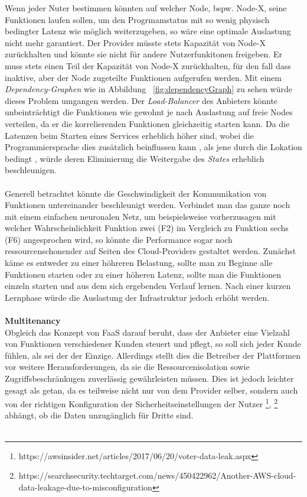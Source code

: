 \documentclass[11pt]{article}
\begin{document}
Wenn jeder Nuter bestimmen könnten auf welcher Node, bspw. Node-X, seine Funktionen laufen sollen, um den Progrmamstatus mit so wenig physisch bedingter Latenz wie möglich weiterzugeben, so wäre eine optimale Auslastung nicht mehr garantiert. Der Provider müsste stets Kapazität von Node-X zurückhalten und könnte sie nicht für andere Nutzerfunkitonen freigeben. Er muss stets einen Teil der Kapazität von Node-X zurückhalten, für den fall dass inaktive, aber der Node zugeteilte Funktionen aufgerufen werden. Mit einem \textit{Dependency-Graphen} wie in Abbildung ~\ref{fig:dependencyGraph} zu sehen würde dieses Problem umgangen werden. Der \textit{Load-Balancer} des Anbieters könnte unbeinträchtigt die Funktionen wie gewohnt je nach Auslastung auf freie Nodes verteilen, da er die korrelierenden Funktionen \glqq gleichzeitig\grqq{} starten kann. Da die Latenzen beim Starten eines Services erheblich höher sind, wobei die Programmiersprache dies zusätzlich beinflussen kann \cite{manner2018cold}, als jene durch die Lokation bedingt \cite{aditya2019will} \cite{jackson2018investigation}, würde deren Eliminierung die Weitergabe des \textit{States} erheblich beschleunigen. \\\\
Generell betrachtet könnte die Geschwindigkeit der Kommunikation von Funktionen untereinander beschleunigt werden. Verbindet man das ganze noch mit einem einfachen neuronalen Netz, um beispielsweise vorherzusagen mit welcher Wahrscheinlichkeit Funktion zwei (F2) im Vergleich zu Funktion sechs (F6) angesprochen wird, so könnte die Performance sogar noch ressourcenschonender auf Seiten des Cloud-Providers gestaltet werden. Zunächst käme es entweder zu einer höhreren Belastung, sollte man zu Beginne alle Funktionen starten oder zu einer höheren Latenz, sollte man die Funktionen einzeln starten und aus dem sich ergebenden Verlauf lernen. Nach einer kurzen Lernphase würde die Auslastung der Infrastruktur jedoch erhöht werden. \\\\
\glqq \textbf{Multitenancy}\grqq{}\\
Obgleich das Konzept von FaaS darauf beruht, dass der Anbieter eine Vielzahl von Funktionen verschiedener Kunden steuert und pflegt, so soll sich jeder Kunde fühlen, als sei der der Einzige. Allerdings stellt dies die Betreiber der Plattformen vor weitere Herausforderungen, da sie die Ressourcenisolation sowie Zugriffsbeschränkugen zuverlässig gewährleisten müssen. Dies ist jedoch leichter gesagt als getan, da es teilweise nicht nur von dem Provider selber, sondern auch von der richtigen Konfiguration der Sicherheitseinstellungen der Nutzer \footnote{https://awsinsider.net/articles/2017/06/20/voter-data-leak.aspx}, \footnote{https://searchsecurity.techtarget.com/news/450422962/Another-AWS-cloud-data-leakage-due-to-misconfiguration} abhängt, ob die Daten unzugänglich für Dritte sind. \\\\
\end{document}
